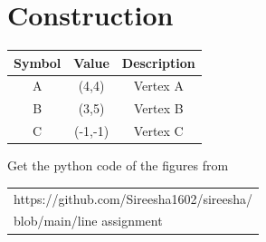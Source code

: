 \documentclass[journal,12pt,twocolumn]{IEEEtran}
\begin{document}
\vspace{0.2cm}
\section*{Construction}
\centering
\vspace{0.2cm}
{
\setlength\extrarowheight{2pt}
\begin{tabular}{|c|c|c|}
	\hline
	\textbf{Symbol}&\textbf{Value}&\textbf{Description}\\
	\hline
	A & (4,4) & Vertex A\\
	\hline
	B & (3,5) & Vertex B\\
	\hline
	C & (-1,-1) & Vertex C\\
	\hline
	
\end{tabular}
}

\vspace{0.6cm}
Get the python code of the figures from
\begin{table}[h]
\large
\centering
\begin{tabular}{|l|}
\hline
https://github.com/Sireesha1602/sireesha/
\\blob/main/line assignment \\
\hline
\end{tabular}

\end{table}
\end{document}
